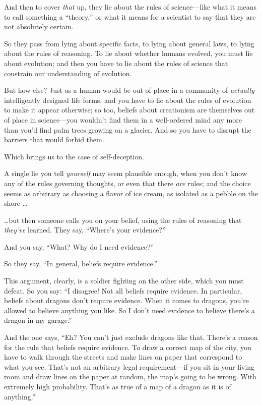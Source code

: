 {
 And then to cover \textit{that} up, they lie about the rules of
science---like what it means to call something a
``theory,'' or what it means for a
scientist to say that they are not absolutely certain.}

{
 So they pass from lying about specific facts, to lying about
general laws, to lying about the rules of reasoning. To lie about
whether humans evolved, you must lie about evolution; and then you have
to lie about the rules of science that constrain our understanding of
evolution.}

{
 But how else? Just as a human would be out of place in a community
of \textit{actually} intelligently designed life forms, and you have to
lie about the rules of evolution to make it appear otherwise; so too,
beliefs about creationism are themselves out of place in science---you
wouldn't find them in a well-ordered mind any more than
you'd find palm trees growing on a glacier. And so you
have to disrupt the barriers that would forbid them.}

{
 Which brings us to the case of self-deception.}

{
 A single lie you tell \textit{yourself} may seem plausible enough,
when you don't know any of the rules governing
thoughts, or even that there \textit{are} rules; and the choice seems
as arbitrary as choosing a flavor of ice cream, as isolated as a pebble
on the shore \ldots}

{
 \ldots but then someone calls you on your belief, using the rules
of reasoning that \textit{they've} learned. They say,
``Where's your
evidence?''}

{
 And you say, ``What? Why do I need
evidence?''}

{
 So they say, ``In general, beliefs require
evidence.''}

{
 This argument, clearly, is a soldier fighting on the other side,
which you must defeat. So you say: ``I disagree! Not
all beliefs require evidence. In particular, beliefs about dragons
don't require evidence. When it comes to dragons,
you're allowed to believe anything you like. So I
don't need evidence to believe there's
a dragon in my garage.''}

{
 And the one says, ``Eh? You can't
just exclude dragons like that. There's a reason for
the rule that beliefs require evidence. To draw a correct map of the
city, you have to walk through the streets and make lines on paper that
correspond to what you see. That's not an arbitrary
legal requirement---if you sit in your living room and draw lines on
the paper at random, the map's going to be wrong. With
extremely high probability. That's as true of a map of
a dragon as it is of anything.''}

